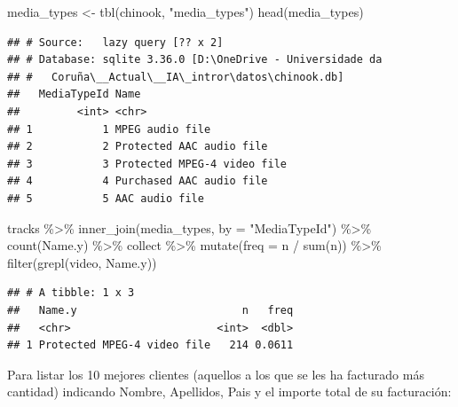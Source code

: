 \documentclass[
]{book}
\newenvironment{Shaded}{\begin{snugshade}}{\end{snugshade}}
\newcommand{\AttributeTok}[1]{\textcolor[rgb]{0.77,0.63,0.00}{#1}}
\newcommand{\FunctionTok}[1]{\textcolor[rgb]{0.00,0.00,0.00}{#1}}
\newcommand{\NormalTok}[1]{#1}
\newcommand{\OtherTok}[1]{\textcolor[rgb]{0.56,0.35,0.01}{#1}}
\newcommand{\SpecialCharTok}[1]{\textcolor[rgb]{0.00,0.00,0.00}{#1}}
\newcommand{\StringTok}[1]{\textcolor[rgb]{0.31,0.60,0.02}{#1}}
\theoremstyle{break}
\theoremstyle{nonumberplain}
\begin{document}
\begin{Shaded}
\begin{Highlighting}[]
\NormalTok{media\_types }\OtherTok{\textless{}{-}} \FunctionTok{tbl}\NormalTok{(chinook, }\StringTok{"media\_types"}\NormalTok{)}
\FunctionTok{head}\NormalTok{(media\_types)}
\end{Highlighting}
\end{Shaded}

\begin{verbatim}
## # Source:   lazy query [?? x 2]
## # Database: sqlite 3.36.0 [D:\OneDrive - Universidade da
## #   Coruña\__Actual\__IA\_intror\datos\chinook.db]
##   MediaTypeId Name                       
##         <int> <chr>                      
## 1           1 MPEG audio file            
## 2           2 Protected AAC audio file   
## 3           3 Protected MPEG-4 video file
## 4           4 Purchased AAC audio file   
## 5           5 AAC audio file
\end{verbatim}

\begin{Shaded}
\begin{Highlighting}[]
\NormalTok{tracks }\SpecialCharTok{\%\textgreater{}\%} \FunctionTok{inner\_join}\NormalTok{(media\_types, }\AttributeTok{by =} \StringTok{"MediaTypeId"}\NormalTok{) }\SpecialCharTok{\%\textgreater{}\%} \FunctionTok{count}\NormalTok{(Name.y) }\SpecialCharTok{\%\textgreater{}\%} 
\NormalTok{    collect }\SpecialCharTok{\%\textgreater{}\%} \FunctionTok{mutate}\NormalTok{(}\AttributeTok{freq =}\NormalTok{ n }\SpecialCharTok{/} \FunctionTok{sum}\NormalTok{(n)) }\SpecialCharTok{\%\textgreater{}\%} \FunctionTok{filter}\NormalTok{(}\FunctionTok{grepl}\NormalTok{(}\StringTok{\textquotesingle{}video\textquotesingle{}}\NormalTok{, Name.y))}
\end{Highlighting}
\end{Shaded}

\begin{verbatim}
## # A tibble: 1 x 3
##   Name.y                          n   freq
##   <chr>                       <int>  <dbl>
## 1 Protected MPEG-4 video file   214 0.0611
\end{verbatim}

Para listar los 10 mejores clientes (aquellos a los que se les ha facturado más cantidad) indicando Nombre, Apellidos, Pais y el importe total de su facturación:
\end{document}

